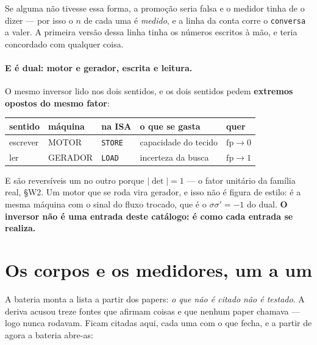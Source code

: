 \documentclass[11pt]{article}
\newcommand{\code}[1]{\texttt{\small #1}}
\theoremstyle{plain}
\theoremstyle{remark}
\begin{document}
\begin{itemize}
\noindent Se alguma não tivesse essa forma, a promoção seria falsa e o medidor tinha de o dizer ---
por isso o $n$ de cada uma é \emph{medido}, e a linha da conta corre o \code{conversa} a valer. A
primeira versão dessa linha tinha os números escritos à mão, e teria concordado com qualquer coisa.

\paragraph{E é dual: motor e gerador, escrita e leitura.} O mesmo inversor lido nos dois sentidos, e
os dois sentidos pedem \textbf{extremos opostos do mesmo fator}:

\begin{center}\small
\begin{tabular}{lllll}
\hline
sentido & máquina & na ISA & o que se gasta & quer \\ \hline
escrever & MOTOR & \code{STORE} & capacidade do tecido & $\mathrm{fp} \to 0$ \\
ler & GERADOR & \code{LOAD} & incerteza da busca & $\mathrm{fp} \to 1$ \\
\hline
\end{tabular}
\end{center}

\noindent E são reversíveis um no outro porque $|\det| = 1$ --- o fator unitário da família real,
§W2. Um motor que se roda vira gerador, e isso não é figura de estilo: é a mesma máquina com o sinal
do fluxo trocado, que é o $\sigma\sigma' = -1$ do dual. \textbf{O inversor não é uma entrada deste
catálogo: é como cada entrada se realiza.}
\end{itemize}

\section{Os corpos e os medidores, um a um}

A bateria monta a lista a partir dos papers: \emph{o que não é citado não é testado}. A deriva
acusou treze fontes que afirmam coisas e que nenhum paper chamava --- logo nunca rodavam. Ficam
citadas aqui, cada uma com o que fecha, e a partir de agora a bateria abre-as:
\end{document}
